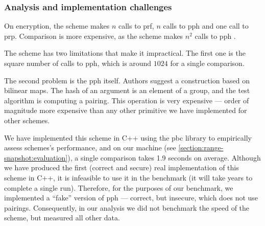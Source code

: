 	\subsubsection{Analysis and implementation challenges}

		On encryption, the scheme makes $n$ calls to \acrshort{prf}, $n$ calls to \acrshort{pph}  and one call to \acrshort{prp}.
		Comparison is more expensive, as the scheme makes $n^2$ calls to \acrshort{pph} .

		The scheme has two limitations that make it impractical.
		The first one is the square number of calls to \acrshort{pph}, which is around $1024$ for a single comparison.

		The second problem is the \acrshort{pph} itself.
		Authors suggest a construction based on bilinear maps.
		The hash of an argument is an element of a group, and the test algorithm is computing a pairing.
		This operation is very expensive --- order of magnitude more expensive than any other primitive we have implemented for other schemes.

		We have implemented this scheme in C++ using the \acrshort{pbc} library \cite{pbc} to empirically assess schemes's performance, and on our machine (see \cref{section:range-snapshot:evaluation}), a single comparison takes 1.9 seconds on average.
		Although we have produced the first (correct and secure) real implementation of this scheme in C++, it is infeasible to use it in the benchmark (it will take years to complete a single run).
		Therefore, for the purposes of our benchmark, we implemented a ``fake'' version of \acrshort{pph} --- correct, but insecure, which does not use pairings.
		Consequently, in our analysis we did not benchmark the speed of the scheme, but measured all other data.

